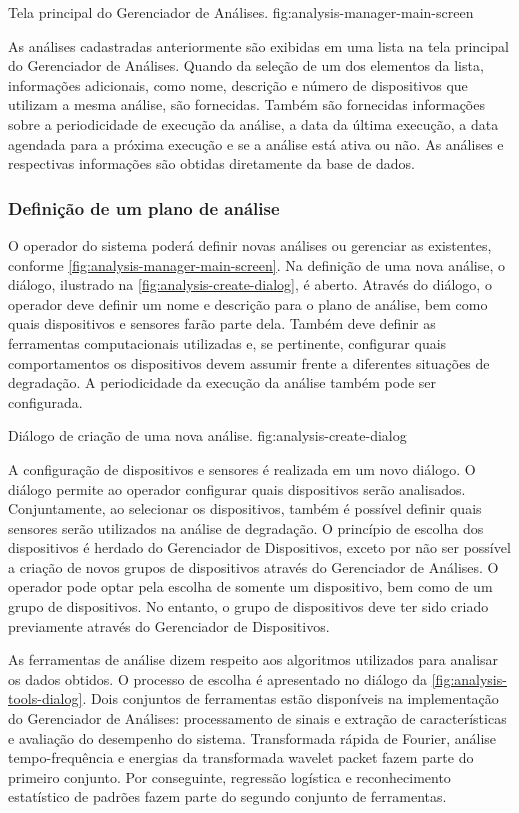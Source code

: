   {Tela principal do Gerenciador de Análises.}
  {fig:analysis-manager-main-screen}

As análises cadastradas anteriormente são exibidas em uma lista na tela principal do Gerenciador de
Análises. Quando da seleção de um dos elementos da lista, informações adicionais, como nome,
descrição e número de dispositivos que utilizam a mesma análise, são fornecidas. Também são
fornecidas informações sobre a periodicidade de execução da análise, a data da última execução, a
data agendada para a próxima execução e se a análise está ativa ou não. As análises e respectivas
informações são obtidas diretamente da base de dados.


\subsubsection{Definição de um plano de análise}

O operador do sistema poderá definir novas análises ou gerenciar as existentes, conforme
\cref{fig:analysis-manager-main-screen}. Na definição de uma nova análise, o diálogo, ilustrado na
\cref{fig:analysis-create-dialog}, é aberto. Através do diálogo, o operador deve definir um nome e
descrição para o plano de análise, bem como quais dispositivos e sensores farão parte dela. Também
deve definir as ferramentas computacionais utilizadas e, se pertinente, configurar quais
comportamentos os dispositivos devem assumir frente a diferentes situações de degradação. A
periodicidade da execução da análise também pode ser configurada.

  {Diálogo de criação de uma nova análise.}
  {fig:analysis-create-dialog}

A configuração de dispositivos e sensores é realizada em um novo diálogo. O diálogo permite ao
operador configurar quais dispositivos serão analisados. Conjuntamente, ao selecionar os
dispositivos, também é possível definir quais sensores serão utilizados na análise de degradação. O
princípio de escolha dos dispositivos é herdado do Gerenciador de Dispositivos, exceto por não ser
possível a criação de novos grupos de dispositivos através do Gerenciador de Análises. O operador
pode optar pela escolha de somente um dispositivo, bem como de um grupo de dispositivos. No entanto,
o grupo de dispositivos deve ter sido criado previamente através do Gerenciador de Dispositivos.

As ferramentas de análise dizem respeito aos algoritmos utilizados para analisar os dados obtidos. O
processo de escolha é apresentado no diálogo da \cref{fig:analysis-tools-dialog}. Dois conjuntos de
ferramentas estão disponíveis na implementação do Gerenciador de Análises: processamento de sinais e
extração de características e avaliação do desempenho do sistema. Transformada rápida de Fourier,
análise tempo-frequência e energias da transformada wavelet packet fazem parte do primeiro conjunto.
Por conseguinte, regressão logística e reconhecimento estatístico de padrões fazem parte do segundo
conjunto de ferramentas.

